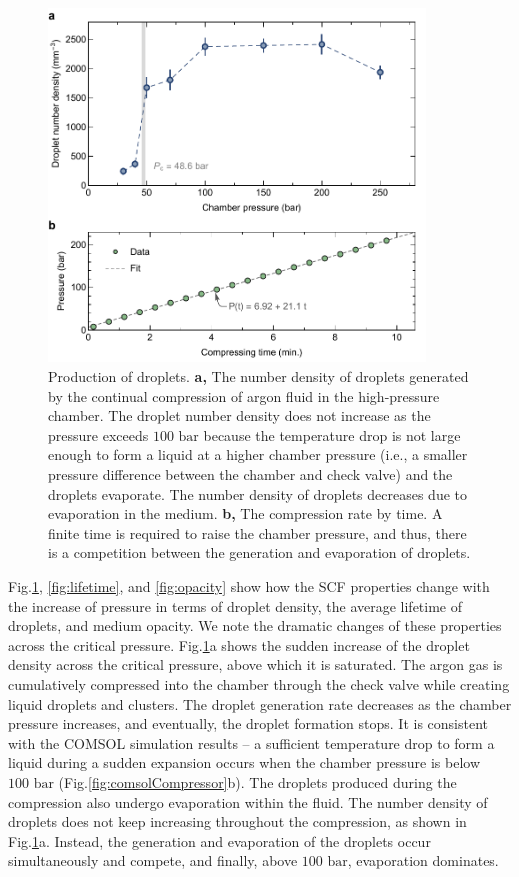 \begin{figure}[ht!]
\centering
\includegraphics[width=100mm]{figures/ch2/droplet/numdens.pdf}
\caption{Production of droplets. \textbf{a,} The number density of droplets generated by the continual compression of argon fluid in the high-pressure chamber. The droplet number density does not increase as the pressure exceeds $100 \text{ bar}$ because the temperature drop is not large enough to form a liquid at a higher chamber pressure (i.e., a smaller pressure difference between the chamber and check valve) and the droplets evaporate. The number density of droplets decreases due to evaporation in the medium. \textbf{b,} The compression rate by time. A finite time is required to raise the chamber pressure, and thus, there is a competition between the generation and evaporation of droplets.}
\label{fig:numdens}
\end{figure}

Fig.\ref{fig:numdens}, \ref{fig:lifetime}, and \ref{fig:opacity} show how the SCF properties change with the increase of pressure in terms of droplet density, the average lifetime of droplets, and medium opacity. We note the dramatic changes of these properties across the critical pressure. Fig.\ref{fig:numdens}a shows the sudden increase of the droplet density across the critical pressure, above which it is saturated. The argon gas is cumulatively compressed into the chamber through the check valve while creating liquid droplets and clusters. The droplet generation rate decreases as the chamber pressure increases, and eventually, the droplet formation stops. It is consistent with the COMSOL simulation results – a sufficient temperature drop to form a liquid during a sudden expansion occurs when the chamber pressure is below $100 \text{ bar}$ (Fig.\ref{fig:comsolCompressor}b). The droplets produced during the compression also undergo evaporation within the fluid. The number density of droplets does not keep increasing throughout the compression, as shown in Fig.\ref{fig:numdens}a. Instead, the generation and evaporation of the droplets occur simultaneously and compete, and finally, above $100 \text{ bar}$, evaporation dominates.

